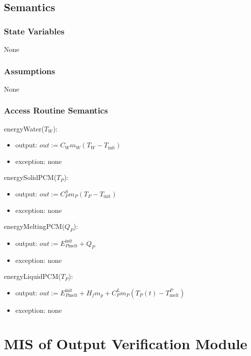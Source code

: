 \documentclass[12pt, titlepage]{article}
\begin{document}
\subsection{Semantics}

\subsubsection{State Variables}

None

\subsubsection{Assumptions}

None

\subsubsection{Access Routine Semantics}

energyWater($T_W$): 
\renewcommand*{\arraystretch}{1.5}
\begin{itemize}
\item output: $out := C_W m_W (T_W - T_\text{init})$
\item exception: none
\end{itemize}

\noindent energySolidPCM($T_P$): 
\renewcommand*{\arraystretch}{1.5}
\begin{itemize}
\item output: $out := C^S_P m_P (T_P - T_\text{init})$
\item exception: none
\end{itemize}

\noindent energyMeltingPCM($Q_P$): 
\renewcommand*{\arraystretch}{1.5}
\begin{itemize}
\item output: $out := E_{P\text{melt}}^{\text{init}} + Q_P$
\item exception: none
\end{itemize}

\noindent energyLiquidPCM($T_P$): 
\renewcommand*{\arraystretch}{1.5}
\begin{itemize}
\item output: $out := E_{P\text{melt}}^{\text{init}}+H_f m_p + C_P^L m_P(T_P(t) - T_\text{melt}^P)$
\item exception: none
\end{itemize}

\newpage
\section{MIS of Output Verification Module} \label{VerifyOutput}
\end{document}
